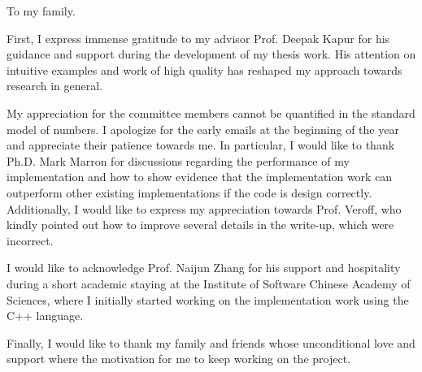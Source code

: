 \begin{dedication}
  To my family.
\end{dedication}

\begin{acknowledgments}
  \vspace{1.1in}

  First, I express immense gratitude to my
  advisor Prof. Deepak Kapur for his guidance 
  and support during the development of my 
  thesis work. His attention on intuitive 
  examples and work of high quality has
  reshaped my approach towards research in 
  general. 

  My appreciation for the committee members
  cannot be quantified in the standard
  model of numbers. I apologize for the early 
  emails at the beginning of the year and 
  appreciate their patience towards me.
  In particular, I would like to thank Ph.D. Mark
  Marron for discussions regarding the performance
  of my implementation and how to show evidence
  that the implementation work can outperform
  other existing implementations if the 
  code is design correctly. 
  Additionally, I would like to express 
  my appreciation towards Prof. Veroff, who kindly 
  pointed out how to improve several details 
  in the write-up, which were
  incorrect.

  I would like to acknowledge Prof. Naijun Zhang
  for his support and hospitality during a
  short academic staying at the Institute
  of Software Chinese Academy of Sciences, where
  I initially started working on the 
  implementation work using the C++ language.

  Finally, I would like to thank my family and
  friends whose unconditional love and support 
  where the motivation for me to keep working 
  on the project.

\end{acknowledgments}

